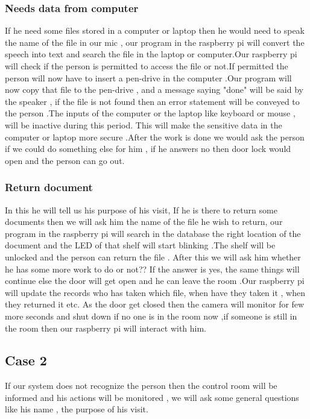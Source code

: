 \documentclass[12pt]{article}
\begin{document}
\subsubsection{Needs data from computer}
If he need some files stored in a computer or laptop then he would need to speak the name of the file in our mic , our program in the raspberry pi will convert the speech into text and search the file in the laptop or computer.Our raspberry pi will check if the person is permitted to access the file or not.If permitted the person will now have to insert a pen-drive in the computer .Our program will now copy that file to the pen-drive , and a message saying "done" will be said by the speaker , if the file is not found then an error statement will be conveyed to the person .The inputs of the computer or the laptop like keyboard or mouse , will be inactive during this period. This will make the sensitive data in the computer or laptop more secure .After the work is done we would ask the person if we could do something else for him , if he answers no then door lock would open and the person can go out.      

\subsubsection{Return document}
In this he will tell us his purpose of his visit, If he is there to return some documents then we will ask him the name of the file he wish to return, our program in the raspberry pi will search in the database the right location of the document and the LED of that shelf will start blinking .The shelf will be unlocked and the person can return the file . After this we will ask him whether he has some more work to do or not?? If the answer is yes, the same things will continue else the door will get open and he can leave the room .Our raspberry pi will update the records who has taken which file, when have they taken it , when they returned it etc. As the door get closed then the camera will monitor for few more seconds and shut down if no one is in the room now ,if someone is still in the room then our raspberry pi will interact with him.

\subsection{Case 2}
If our system does not recognize the person then the control room will be informed and his actions will be monitored , we will ask some general questions like his name , the purpose of his visit. 
\end{document}
